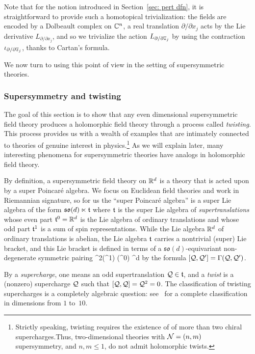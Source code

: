 \documentclass[11pt]{amsart}
\begin{document}
Note that for the notion introduced in Section~\ref{sec: pert dfn},
it is straightforward to provide such a homotopical trivialization: 
the fields are encoded by a Dolbeault complex on $\mathbb C^n$, 
a real translation $\partial/\partial x_j$ acts by the Lie derivative $L_{\partial/\partial x_j}$,
and so we trivialize the action $L_{\partial/\partial {\overline{z}}_j}$ by using the contraction $\iota_{\partial/\partial {\overline{z}}_j}$,
thanks to Cartan's formula.

We now turn to using this point of view in the setting of supersymmetric theories.

\subsubsection{Supersymmetry and twisting}

The goal of this section is to show that any even dimensional supersymmetric field theory produces a holomorphic field theory through a process called {\em twisting}.
This process provides us with a wealth of examples that are intimately connected to theories of genuine interest in physics.\footnote{Strictly speaking, twisting requires the existence of of more than two chiral supercharges.Thus, two-dimensional theories with $\mathcal N = (n,m)$ supersymmetry, and $n,m \leq 1$, do not admit holomorphic twists.}
As we will explain later, many interesting phenomena for supersymmetric theories have analogs in holomorphic field theory.
 
By definition, a supersymmetric field theory on $\mathbb R^d$ is a theory that is acted upon by a super Poincar\'{e} algebra. 
We focus on Euclidean field theories and work in Riemannian signature,
so for us the ``super Poincar\'{e} algebra'' is a super Lie algebra of the form
$\mathfrak{so}(d) \ltimes \mathfrak t$
where $\mathfrak t$ is the super Lie algebra of {\em supertranslations} whose even part $\mathfrak t^0 = \mathbb R^d$ is the Lie algebra of ordinary translations and whose odd part $\mathfrak t^1$ is a sum of spin representations. 
While the Lie algebra $\mathbb R^d$ of ordinary translations is abelian, the Lie algebra $\mathfrak t$ carries a nontrivial (super) Lie bracket,
and this Lie bracket is defined in terms of a $\mathfrak{so}(d)$-equivariant non-degenerate symmetric pairing
\beqn
\label{e:Gamma}
\Gamma {}^2(\ft^{1}) (\ft^0) \cong \RR^d 
\eeqn
by the formula $[\mathcal Q, \mathcal Q'] = \Gamma(\mathcal Q, \mathcal Q')$. 

By a {\em supercharge}, one means an odd supertranslation $\mathcal Q \in \mathfrak t$, and
a {\em twist} is a (nonzero) supercharge $\mathcal Q$ such that $[\mathcal Q,\mathcal Q] = \mathcal Q^2 = 0$. 
The classification of twisting supercharges is a completely algebraic question:
see~\autocite{ESsusy} for a complete classification in dimensions from $1$ to~$10$.
\end{document}
